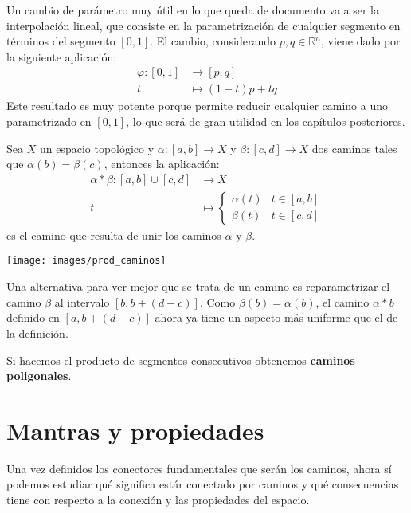 \begin{ej}
Un cambio de parámetro muy útil en lo que queda de documento va a ser la interpolación lineal, que consiste en la parametrización de cualquier segmento en términos del segmento $[0,1]$. El cambio, considerando $p, q\in \mathbb{R}^n$, viene dado por la siguiente aplicación:
\begin{align*}
\varphi : [0, 1] &\longrightarrow [p, q] \\
			t & \longmapsto (1-t)p + tq
\end{align*}
Este resultado es muy potente porque permite reducir cualquier camino a uno parametrizado en $[0,1]$, lo que será de gran utilidad en los capítulos posteriores.
\end{ej}

\begin{defi}
Sea $X$ un espacio topológico y $\alpha : [a,b]\rightarrow X$ y $\beta:[c,d]\rightarrow X$ dos caminos tales que $\alpha(b) = \beta(c)$, entonces la aplicación:
\begin{align*}
\alpha \ast \beta : [a,b] \cup [c,d] &\longrightarrow X \\
						t &\longmapsto \begin{cases}
										\alpha(t) & t \in [a,b] \\
										\beta(t) & t\in [c,d]
										\end{cases}	
\end{align*}
es el camino que resulta de unir los caminos $\alpha$ y $\beta$.
\begin{center}
    \texttt{[image: images/prod\_caminos]} 
\end{center}
\end{defi}

\begin{obs}
Una alternativa para ver mejor que se trata de un camino es reparametrizar el camino $\beta$ al intervalo $[b,b+(d-c)]$. Como $\beta(b) = \alpha(b)$, el camino $\alpha \ast b$ definido en $[a,b+(d-c)]$ ahora ya tiene un aspecto más uniforme que el de la definición.
\end{obs}

\begin{ej}
Si hacemos el producto de segmentos consecutivos obtenemos \textbf{caminos poligonales}. 
\end{ej}

\section{Mantras y propiedades}%
\label{sec:conexion_por_caminos}
Una vez definidos los conectores fundamentales que serán los caminos, ahora sí podemos estudiar qué significa estár conectado por caminos y qué consecuencias tiene con respecto a la conexión y las propiedades del espacio.


